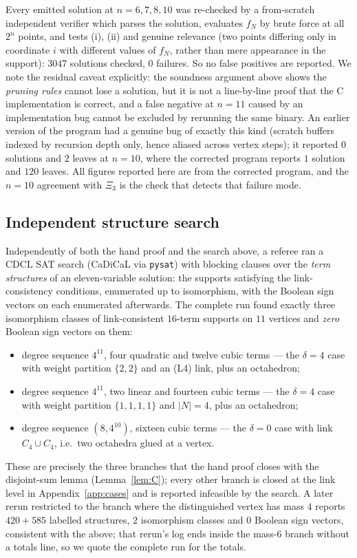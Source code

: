 \documentclass[11pt,reqno]{amsart}
\theoremstyle{plain}
\theoremstyle{definition}
\numberwithin{theorem}{section}
\newcommand{\XiC}{\Xi}
\begin{document}
Every emitted solution at $n = 6, 7, 8, 10$ was re-checked by a from-scratch independent
verifier which parses the solution, evaluates $f_N$ by brute force at all $2^n$ points, and
tests (i), (ii) and genuine relevance (two points differing only in coordinate $i$ with
different values of $f_N$, rather than mere appearance in the support): $3047$ solutions
checked, $0$ failures. So no false positives are reported. We note the residual caveat
explicitly: the soundness argument above shows the \emph{pruning rules} cannot lose a solution,
but it is not a line-by-line proof that the C implementation is correct, and a false negative at
$n = 11$ caused by an implementation bug cannot be excluded by rerunning the same binary. An
earlier version of the program had a genuine bug of exactly this kind (scratch buffers indexed
by recursion depth only, hence aliased across vertex steps); it reported $0$ solutions and $2$
leaves at $n = 10$, where the corrected program reports $1$ solution and $120$ leaves. All
figures reported here are from the corrected program, and the $n = 10$ agreement with $\XiC_3$
is the check that detects that failure mode.

\subsection{Independent structure search}
Independently of both the hand proof and the search above, a referee ran a CDCL SAT search
(CaDiCaL via \texttt{pysat}) with blocking clauses over the \emph{term structures} of an
eleven-variable solution: the supports satisfying the link-consistency conditions, enumerated up
to isomorphism, with the Boolean sign vectors on each enumerated afterwards. The complete run
found exactly three isomorphism classes of link-consistent $16$-term supports on $11$ vertices
and \emph{zero} Boolean sign vectors on them:
\begin{itemize}[leftmargin=1.4em]
  \item degree sequence $4^{11}$, four quadratic and twelve cubic terms --- the $\delta = 4$
  case with weight partition $\{2,2\}$ and an (L4) link, plus an octahedron;
  \item degree sequence $4^{11}$, two linear and fourteen cubic terms --- the $\delta = 4$ case
  with weight partition $\{1,1,1,1\}$ and $|N| = 4$, plus an octahedron;
  \item degree sequence $(8, 4^{10})$, sixteen cubic terms --- the $\delta = 0$ case with link
  $C_4 \cup C_4$, i.e.\ two octahedra glued at a vertex.
\end{itemize}
These are precisely the three branches that the hand proof closes with the disjoint-sum lemma
(Lemma~\ref{lem:C}); every other branch is closed at the link level in
Appendix~\ref{app:cases} and is reported infeasible by the search. A later rerun restricted to
the branch where the distinguished vertex has mass $4$ reports $420 + 585$ labelled structures,
$2$ isomorphism classes and $0$ Boolean sign vectors, consistent with the above; that rerun's
log ends inside the mass-$6$ branch without a totals line, so we quote the complete run for the
totals.
\end{document}
